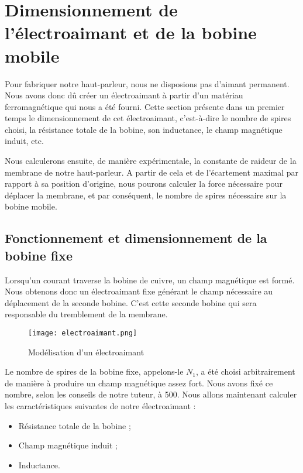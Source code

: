 

\section{Dimensionnement de l'électroaimant et de la bobine mobile}
Pour fabriquer notre haut-parleur, nous ne disposions pas d'aimant permanent. Nous avons donc
dû créer un électroaimant à partir d'un matériau ferromagnétique qui nous a été fourni.
Cette section présente dans un premier temps le dimensionnement de cet électroaimant, c'est-à-dire le
nombre de spires choisi, la résistance totale de la bobine, son inductance, le champ magnétique
induit, etc.

Nous calculerons ensuite, de manière expérimentale, la constante de raideur de la membrane de
notre haut-parleur. A partir de cela et de l'écartement maximal par rapport à sa position d'origine, 
nous pourons calculer la force nécessaire pour déplacer la membrane, et par conséquent, le nombre
de spires nécessaire sur la bobine mobile.

\subsection{Fonctionnement et dimensionnement de la bobine fixe}
Lorsqu'un courant traverse la bobine de cuivre, un champ magnétique est formé.  Nous obtenons 
donc un électroaimant fixe générant le champ nécessaire au déplacement de la seconde bobine. 
C'est cette seconde bobine qui sera responsable du tremblement de la membrane.

\begin{figure}[h]
\centering
\texttt{[image: electroaimant.png]}
\caption{Modélisation d'un électroaimant}
\label{modélisation de l'électroaimant}
\end{figure}

Le nombre de spires de la bobine fixe, appelons-le $N_1$, a été choisi arbitrairement de manière à produire un
champ magnétique assez fort. Nous avons fixé ce nombre, selon les conseils de notre tuteur, à 500. 
Nous allons maintenant calculer les caractéristiques suivantes de notre électroaimant :

\begin{itemize}
	\item Résistance totale de la bobine ;
	\item Champ magnétique induit ;
	\item Inductance.
\end{itemize}

